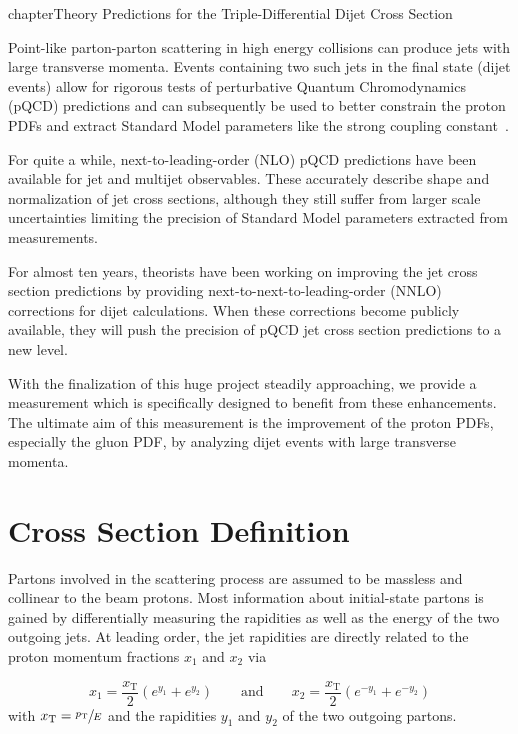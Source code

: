 
chapter{Theory Predictions for the Triple-Differential Dijet Cross Section}

Point-like parton-parton scattering in high energy collisions can produce
jets with large transverse momenta. Events containing two such jets  in the
final state (dijet events) allow for rigorous tests of perturbative Quantum
Chromodynamics (pQCD) predictions and can subsequently be used to better
constrain the proton PDFs and extract Standard Model parameters like the strong
coupling constant~\as.

For quite a while, next-to-leading-order (NLO) pQCD predictions have been available
for jet and multijet observables. These accurately describe shape and
normalization of jet cross sections, although they still suffer from larger scale
uncertainties limiting the precision of Standard Model parameters extracted from
measurements.

For almost ten years, theorists have been working on improving the jet cross
section predictions by providing next-to-next-to-leading-order (NNLO) corrections for
dijet calculations. When these corrections become publicly available, they will
push the precision of pQCD jet cross section predictions to a new level.

With the finalization of this huge project steadily approaching, we provide a
measurement which is specifically designed to benefit from these enhancements.
The ultimate aim of this measurement is the improvement of the proton PDFs,
especially the gluon PDF, by analyzing dijet events with large transverse momenta.

\section{Cross Section Definition}

Partons involved in the scattering process are assumed to be massless and
collinear to the beam protons. Most information about initial-state partons
is gained by differentially measuring the rapidities as well as the energy of
the two outgoing jets. At leading order, the jet rapidities are directly
related to the proton momentum fractions $x_1$ and $x_2$ via

\begin{equation*}
    x_1 = \frac{x_\mathrm{T}}{2} \left( e^{y_1} + e^{y_2} \right)
    \qquad\text{and}\qquad x_2 = \frac{x_\mathrm{T}}{2} \left( e^{-y_1} +
    e^{-y_2} \right)
\end{equation*}
with $x_{\mathrm{T}} = \sfrac{p_{\mathrm{T}}}{E}$ and the rapidities $y_1$ and $y_2$ of the two outgoing
partons.

